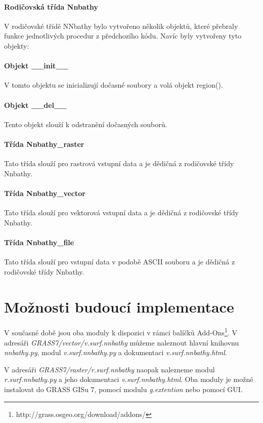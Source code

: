 \documentclass[12pt,a4paper]{article}
\begin{document}
\paragraph{Rodičovská třída Nnbathy} V rodičovské třídě NNbathy bylo vytvořeno několik objektů, které přebraly funkce jednotlivých procedur z předchozího kódu. Navíc byly vytvořeny tyto objekty:

\paragraph{Objekt \_\_init\_\_}
V tomto objektu se inicializují dočasné soubory a volá objekt region().

\paragraph{Objekt \_\_del\_\_}
Tento objekt slouží k odstranění dočasných souborů.

\paragraph{Třída Nnbathy\_raster}
Tato třída slouží pro rastrová vstupní data a je dědičná z rodičovské třídy Nnbathy.

\paragraph{Třída Nnbathy\_vector}
Tato třída slouží pro vektorová vstupní data a je dědičná z rodičovské třídy Nnbathy.

\paragraph{Třída Nnbathy\_file}
Tato třída slouží pro vstupní data v podobě ASCII souboru a je dědičná z rodičovské třídy Nnbathy.

\newpage
\section{Možnosti budoucí implementace}
V současné době jsou oba moduly k dispozici v rámci balíčků Add-Ons\footnote{http://grass.osgeo.org/download/addons/}. V adresáři \textit{GRASS7/vector/v.surf.nnbathy} můžeme  naleznout hlavní knihovnu \textit{nnbathy.py}, modul \textit{v.surf.nnbathy.py} a dokumentaci \textit{v.surf.nnbathy.html}. 

V adresáři \textit{GRASS7/raster/r.surf.nnbathy} naopak nalezneme modul \textit{r.surf.nnbathy.py} a jeho dokumentaci \textit{v.surf.nnbathy.html}. Oba moduly je možné instalovat do GRASS GISu 7, pomocí modulu \textit{g.extention} nebo pomocí GUI.
\end{document}
